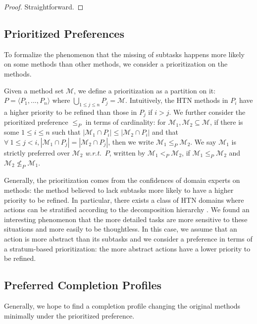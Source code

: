 \documentclass[letterpaper]{article} %
\newcommand{\Methods}{\mathcal{M}}
\newcommand{\prefer}{\leq_P}
\begin{document}
\begin{proof}
Straightforward.
\end{proof}



\subsection{Prioritized Preferences}


To formalize the phenomenon that the missing of subtasks happens more likely on some methods than other methods,
we consider a prioritization on the methods. %


Given a method set $\Methods$, we define a prioritization as a partition on it: $P {=} \langle P_1,...,P_n \rangle$ where $\bigcup_{1\leq j \leq n} P_j =\Methods$. %
Intuitively, the HTN methods in $P_i$ have a higher priority to be refined than those in $P_j$ if $i > j$.
We further consider the prioritized preference $\leq_P$ in terms of cardinality: %
for $\Methods_1,\Methods_2\subseteq \Methods$,
if %
there is some $1 \!\leq i\! \leq n$ such that
$|\Methods_1 \!\cap\! P_i| \!\leq\! |\Methods_2 \!\cap\! P_i|$ and that
$\forall\ 1 \!\leq\! j \!<\! i,  |\Methods_1 \!\cap\! P_j| \!=\! |\Methods_2 \!\cap\! P_j|$,
then we write $\Methods_1 \!\leq_P\! \Methods_2$.
We say $\Methods_1$ is strictly preferred over $\Methods_2$ \emph{w.r.t.}\ $P$, written by $\Methods_1 \!<_P\! \Methods_2$, if $\Methods_1 \!\prefer\! \Methods_2$ and $\Methods_2 \!\not\prefer\! \Methods_1$.


Generally, the prioritization comes from the confidences of domain experts on methods: the method believed to lack subtasks more likely to have a higher priority to be refined.
In particular, there exists a class of HTN domains where actions can be stratified according to the decomposition hierarchy \cite{erol1996complexity,DBLP:conf/socs/AlfordSKN12}.
We found an interesting phenomenon that the more detailed tasks are more sensitive to these situations and more easily to be thoughtless.
In this case, we assume that an action is more abstract than its subtasks and we consider a preference in terms of a stratum-based prioritization: the more abstract actions have a lower priority to be refined.

\subsection{Preferred Completion Profiles}
Generally, we hope to find a completion profile changing the original methods minimally under the prioritized preference.
\end{document}
